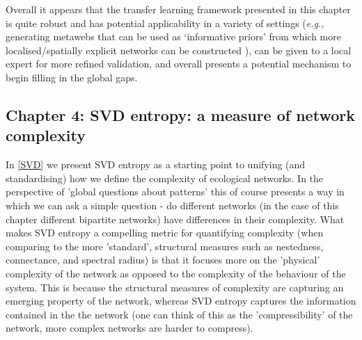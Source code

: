 Overall it appears that the transfer learning framework presented in this chapter is quite robust and has potential applicability in a variety of settings (\emph{e.g.,} generating metawebs that can be used as `informative priors' from which more localised/spatially explicit networks can be constructed \cite{Cirtwill2019QuaFra}), can be given to a local expert for more refined validation, and overall presents a potential mechanism to begin filling in the global gaps.

\subsection{Chapter 4: SVD entropy: a measure of network complexity}

In \autoref{SVD} we present SVD entropy as a starting point to
unifying (and standardising) how we define the complexity of ecological
networks. In the perspective of 'global questions about patterns' this of course presents a way in which we can ask a simple question - do different networks (in the case of this chapter different bipartite networks) have differences in their complexity. What makes SVD entropy a compelling metric for quantifying complexity (when comparing to the more 'standard', structural measures such as nestedness, connectance, and spectral radius) is that it focuses more on the 'physical' complexity of the network as opposed to the complexity of the behaviour of the system. This is because the structural measures of complexity are capturing an emerging property of the network, whereas SVD entropy captures the information contained in the the network (one can think of this as the 'compressibility' of the network, more complex networks are harder to compress).


